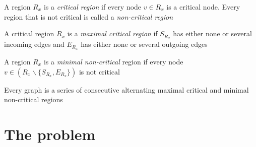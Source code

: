\documentclass[thesis.tex]{subfiles}
\begin{document}
\begin{defn}
	A region $R_x$ is a \textit{critical region} if every node $v \in R_x$ is a critical node. Every region that is not critical is called a \textit{non-critical region}
\end{defn}
\begin{defn}
	A critical region $R_x$ is a \textit{maximal critical region} if $S_{R_x}$ has either none or several incoming edges and $E_{R_x}$ has either none or several outgoing edges
\end{defn}
\begin{defn}
	A region $R_x$ is a \textit{minimal non-critical} region if every node $v \in (R_x \backslash \{S_{R_x}, E_{R_x}\})$ is not critical
\end{defn}
\begin{corollary}
	Every graph is a series of consecutive alternating maximal critical and minimal non-critical regions
\end{corollary}
\section{The problem}
\end{document}
